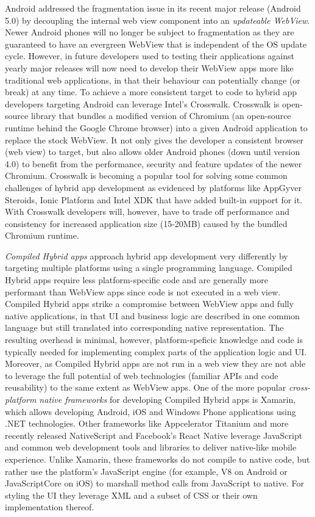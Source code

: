\documentclass[thesis.tex]{subfiles}
\begin{document}
Android addressed the fragmentation issue in its recent major release (Android 5.0) by decoupling the internal web view component into an \textit{updateable WebView}. Newer Android phones will no longer be subject to fragmentation as they are guaranteed to have an evergreen WebView that is independent of the OS update cycle. However, in future developers used to testing their applications against yearly major releases will now need to develop their WebView apps more like traditional web applications, in that their behaviour can potentially change (or break) at any time. To achieve a more consistent target to code to hybrid app developers targeting Android can leverage Intel's Crosswalk. Crosswalk is open-source library that bundles a modified version of Chromium (an open-source runtime behind the Google Chrome browser) into a given Android application to replace the stock WebView. It not only gives the developer a consistent browser (web view) to target, but also allows older Android phones (down until version 4.0) to benefit from the performance, security and feature updates of the newer Chromium. Crosswalk is becoming a popular tool for solving some common challenges of hybrid app development as evidenced by platforms like AppGyver Steroids, Ionic Platform and Intel XDK that have added built-in support for it. With Crosswalk developers will, however, have to trade off performance and consistency for increased application size (15-20MB) caused by the bundled Chromium runtime.

\textit{Compiled Hybrid apps} approach hybrid app development very differently by targeting multiple platforms using a single programming language. Compiled Hybrid apps require less platform-specific code and are generally more performant than WebView apps since code is not executed in a web view. Compiled Hybrid apps strike a compromise between WebView apps and fully native applications, in that UI and business logic are described in one common language but still translated into corresponding native representation. The resulting overhead is minimal, however, platform-speficic knowledge and code is typically needed for implementing complex parts of the application logic and UI. Moreover, as Compiled Hybrid apps are not run in a web view they are not able to leverage the full potential of web technologies (familiar APIs and code reusability) to the same extent as WebView apps. One of the more popular \textit{cross-platform native frameworks} for developing Compiled Hybrid apps is Xamarin, which allows developing Android, iOS and Windows Phone applications using .NET technologies. Other frameworks like Appcelerator Titanium and more recently released NativeScript and Facebook's React Native leverage JavaScript and common web development tools and libraries to deliver native-like mobile experience. Unlike Xamarin, these frameworks do not compile to native code, but rather use the platform's JavaScript engine (for example, V8 on Android or JavaScriptCore on iOS) to marshall method calls from JavaScript to native. For styling the UI they leverage XML and a subset of CSS or their own implementation thereof.
\end{document}
